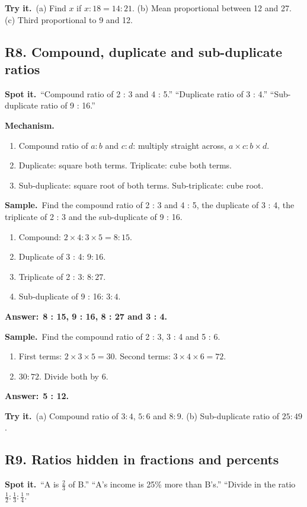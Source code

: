 \documentclass[11pt,a4paper]{article}
\let\oldsubsection\subsection
\renewcommand{\subsection}{\needspace{9\baselineskip}\oldsubsection}
\newcommand{\spot}{\textbf{\color{ember}Spot it.}\ }
\newcommand{\mech}{\textbf{\color{ember}Mechanism.}\ }
\newif\ifkeepsamp
\newcommand{\ans}[1]{\par\nopagebreak\noindent\textbf{\color{ember}Answer:}\ \textbf{#1}\par}
\newcommand{\samp}{\ifkeepsamp\needspace{4\baselineskip}\fi\textbf{\color{ember}Sample.}\ }
\newcommand{\tryit}[1]{\textbf{\color{ember}Try it.}\ #1}
\begin{document}
\tryit (a) Find $x$ if $x : 18 = 14 : 21$. (b) Mean proportional between 12 and 27. (c) Third proportional to 9 and 12.

\subsection{R8. Compound, duplicate and sub-duplicate ratios}
\spot ``Compound ratio of 2 : 3 and 4 : 5.'' ``Duplicate ratio of 3 : 4.'' ``Sub-duplicate ratio of 9 : 16.''

\mech
\begin{enumerate}
\item Compound ratio of $a : b$ and $c : d$: multiply straight across, $a \times c : b \times d$.
\item Duplicate: square both terms. Triplicate: cube both terms.
\item Sub-duplicate: square root of both terms. Sub-triplicate: cube root.
\end{enumerate}

\samp Find the compound ratio of 2 : 3 and 4 : 5, the duplicate of 3 : 4, the triplicate of 2 : 3 and the sub-duplicate of 9 : 16.
\begin{enumerate}
\item Compound: $2 \times 4 : 3 \times 5 = 8 : 15$.
\item Duplicate of 3 : 4: $9 : 16$.
\item Triplicate of 2 : 3: $8 : 27$.
\item Sub-duplicate of 9 : 16: $3 : 4$.
\end{enumerate}
\ans{8 : 15, 9 : 16, 8 : 27 and 3 : 4.}

\samp Find the compound ratio of 2 : 3, 3 : 4 and 5 : 6.
\begin{enumerate}
\item First terms: $2 \times 3 \times 5 = 30$. Second terms: $3 \times 4 \times 6 = 72$.
\item $30 : 72$. Divide both by 6.
\end{enumerate}
\ans{5 : 12.}

\tryit (a) Compound ratio of $3 : 4$, $5 : 6$ and $8 : 9$. (b) Sub-duplicate ratio of $25 : 49$.

\subsection{R9. Ratios hidden in fractions and percents}
\spot ``A is $\tfrac23$ of B.'' ``A's income is 25\% more than B's.'' ``Divide in the ratio $\tfrac12 : \tfrac13 : \tfrac14$.''
\end{document}
